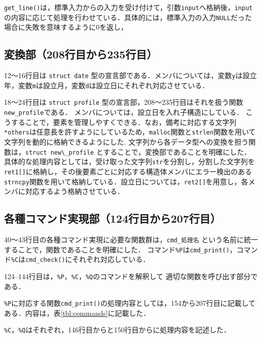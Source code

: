 \documentclass[a4j,11pt]{jarticle}
\begin{document}
\verb|get_line()|は，標準入力からの入力を受け付けて，引数\verb|input|へ格納後，\verb|input|の内容に応じて処理を行わせている．具体的には，標準入力の入力\verb|NULL|だった場合に失敗を意味するように$0$を返し，
\subsection{変換部（208行目から235行目）}

12〜16行目は \verb|struct date| 型の宣言部である．メンバについては，変数\verb|y|は設立年，変数\verb|m|は設立月，変数\verb|d|は設立日にそれぞれ対応させている．

18〜24行目は \verb|struct profile| 型の宣言部，208〜235行目はそれを扱う関数\verb|new_profile|である．
メンバについては，設立日を入れ子構造にしている．
こうすることで，要素を管理しやすくできる．なお，備考に対応する文字列\verb|*others|は任意長を許すようにしているため，\verb|malloc|関数と\verb|strlen|関数を用いて文字列を動的に格納できるようにした. 
文字列から各データ型への変換を担う関数は，\verb|struct new\_profile| とすることで，変換部であることを明確にした．
具体的な処理内容としては，受け取った文字列\verb|str|を分割し，分割した文字列を\verb|ret1[]|に格納し，その後要素ごとに対応する構造体メンバにエラー検出のある\verb|strncpy|関数を用いて格納している．設立日については，\verb|ret2[]|を用意し，各メンバに対応するよう格納させている．

\subsection{各種コマンド実現部（124行目から207行目）}
40〜43行目の各種コマンド実現に必要な関数群は，\verb|cmd_処理名| という名前に統一することで，関数であることを明確にした．
コマンド\verb|%P|は\verb|cmd_print()|，コマンド\verb|%C|は\verb|cmd_check()|にそれぞれ対応している．

124--144行目は，\verb|%P|，\verb|%C|，\verb|%Q|のコマンドを解釈して
適切な関数を呼び出す部分である．

\verb|%P|に対応する関数\verb|cmd_print()|の処理内容としては，154から207行目に記載してある．内容は，表\ref{tbl:commands}に記載した．

\verb|%C|，\verb|%Q|はそれぞれ，146行目からと150行目からに処理内容を記述した．
\end{document}
